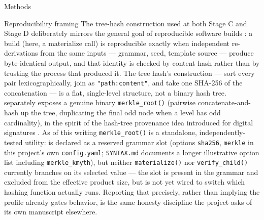 \documentclass[
  ignorenonframetext,
]{beamer}
\begin{document}
\begin{frame}{Methods}
\begin{block}{Reproducibility framing}
\protect{}\label{reproducibility-framing}
The tree-hash construction used at both Stage C and Stage D deliberately
mirrors the general goal of reproducible software builds
: a build (here, a materialize call) is
reproducible exactly when independent re-derivations from the same
inputs --- grammar, seed, template source --- produce byte-identical
output, and that identity is checked by content hash rather than by
trusting the process that produced it. The tree hash's construction ---
sort every  pair lexicographically, join as
\texttt{"path:content"}, and take one SHA-256 of the concatenation ---
is a flat, single-level structure, not a binary hash tree.
 separately exposes a genuine binary
\texttt{merkle\_root()} (pairwise concatenate-and-hash up the tree,
duplicating the final odd node when a level has odd cardinality), in the
spirit of the hash-tree provenance idea introduced for digital
signatures . As of this writing
\texttt{merkle\_root()} is a standalone, independently-tested utility:
 is declared as a reserved grammar slot
(options \texttt{sha256}, \texttt{merkle} in this project's own
\texttt{config.yaml}; \texttt{SYNTAX.md} documents a longer illustrative
option list including \texttt{merkle\_kmyth}), but neither
\texttt{materialize()} nor \texttt{verify\_child()} currently branches
on its selected value --- the slot is present in the grammar and
excluded from the effective product size, but is not yet wired to switch
which hashing function actually runs. Reporting that precisely, rather
than implying the profile already gates behavior, is the same honesty
discipline the project asks of its own manuscript elsewhere.
\end{block}
\end{frame}
\end{document}
